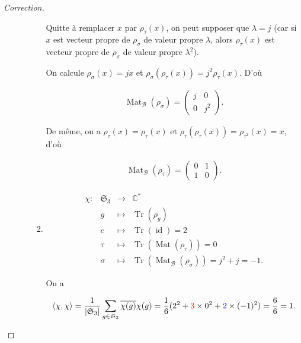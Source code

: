 \documentclass[french]{book}
\theoremstyle{definition}
\begin{document}
\begin{proof}[Correction]
\begin{enumerate}
\begin{enumerate}
\begin{enumerate}
        Quitte à remplacer \(x\) par \(\rho _{\tau}(x)\), on peut supposer que \(\lambda = j\) (car si \(x\) est vecteur propre de \(\rho _{\sigma}\) de valeur propre \(\lambda\), alors \(\rho _{\tau}(x)\) est vecteur propre de \(\rho _{\sigma}\) de valeur propre \(\lambda ^2\)).



        On calcule \(\rho _{\sigma}(x) = jx\) et \(\rho _{\sigma}(\rho _{\tau}(x)) = j ^2 \rho _{\tau}(x)\). D'où

        \begin{gather*}
          \operatorname{Mat}_{\mathcal{B}}(\rho _{\sigma}) = \begin{pmatrix}
          j & 0 \\
          0 & j ^2
          \end{pmatrix}.
        \end{gather*}

        De même, on a \(\rho _{\tau}(x) = \rho _{\tau}(x)\) et \(\rho _{\tau}(\rho _{\tau}(x)) = \rho _{\tau ^2}(x) = x\), d'où

        \begin{gather*}
          \operatorname{Mat} _{\mathcal{B}}(\rho _{\tau}) = \begin{pmatrix}
          0 & 1 \\
          1 & 0
          \end{pmatrix}.
        \end{gather*}
        \item \[\begin{matrix}
        \chi : & \mathfrak{S}_{3} & \longrightarrow & \mathbb{C}^{*} \\
        \ & g & \longmapsto & \operatorname{Tr}(\rho _{g})\\
        \ & e & \longmapsto & \operatorname{Tr}(\operatorname{id}) = 2 \\
        \ & \tau & \longmapsto & \operatorname{Tr}(\operatorname{Mat}(\rho _{\tau})) = 0 \\
        \ & \sigma & \longmapsto & \operatorname{Tr}(\operatorname{Mat} _{\mathcal{B}}(\rho _{\sigma})) = j ^2 + j = -1.
      \end{matrix}\]

        On a

        \begin{gather*}
          \langle \chi, \chi \rangle = \frac{1}{\left\lvert \mathfrak{S}_{3} \right\rvert} \sum_{g \in \mathfrak{S}_{3}} \overline{\chi(g)} \chi(g) = \frac{1}{6}(2 ^2 + \textcolor{red}{3} \times 0 ^2 + \textcolor{blue}{2} \times(-1) ^2)  = \frac{6}{6} = 1.
        \end{gather*}


\end{enumerate}
\end{enumerate}
\end{enumerate}
\end{proof}
\end{document}
